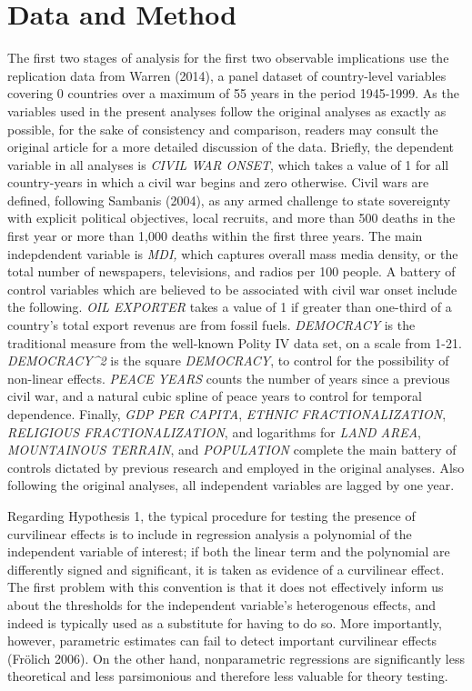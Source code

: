 \documentclass[11pt,article,oneside]{memoir}
\begin{document}
\section{Data and Method}\label{data-and-method}

The first two stages of analysis for the first two observable
implications use the replication data from Warren (2014), a panel
dataset of country-level variables covering 0 countries over a maximum
of 55 years in the period 1945-1999. As the variables used in the
present analyses follow the original analyses as exactly as possible,
for the sake of consistency and comparison, readers may consult the
original article for a more detailed discussion of the data. Briefly,
the dependent variable in all analyses is \emph{CIVIL WAR ONSET}, which
takes a value of 1 for all country-years in which a civil war begins and
zero otherwise. Civil wars are defined, following Sambanis (2004), as
any armed challenge to state sovereignty with explicit political
objectives, local recruits, and more than 500 deaths in the first year
or more than 1,000 deaths within the first three years. The main
indepdendent variable is \emph{MDI,} which captures overall mass media
density, or the total number of newspapers, televisions, and radios per
100 people. A battery of control variables which are believed to be
associated with civil war onset include the following. \emph{OIL
EXPORTER} takes a value of 1 if greater than one-third of a country's
total export revenus are from fossil fuels. \emph{DEMOCRACY} is the
traditional measure from the well-known Polity IV data set, on a scale
from 1-21. \emph{DEMOCRACY\^{}2} is the square \emph{DEMOCRACY}, to
control for the possibility of non-linear effects. \emph{PEACE YEARS}
counts the number of years since a previous civil war, and a natural
cubic spline of peace years to control for temporal dependence. Finally,
\emph{GDP PER CAPITA}, \emph{ETHNIC FRACTIONALIZATION}, \emph{RELIGIOUS
FRACTIONALIZATION}, and logarithms for \emph{LAND AREA},
\emph{MOUNTAINOUS TERRAIN}, and \emph{POPULATION} complete the main
battery of controls dictated by previous research and employed in the
original analyses. Also following the original analyses, all independent
variables are lagged by one year.

Regarding Hypothesis 1, the typical procedure for testing the presence
of curvilinear effects is to include in regression analysis a polynomial
of the independent variable of interest; if both the linear term and the
polynomial are differently signed and significant, it is taken as
evidence of a curvilinear effect. The first problem with this convention
is that it does not effectively inform us about the thresholds for the
independent variable's heterogenous effects, and indeed is typically
used as a substitute for having to do so. More importantly, however,
parametric estimates can fail to detect important curvilinear effects
(Fr{ö}lich 2006). On the other hand, nonparametric regressions are
significantly less theoretical and less parsimonious and therefore less
valuable for theory testing.
\end{document}
